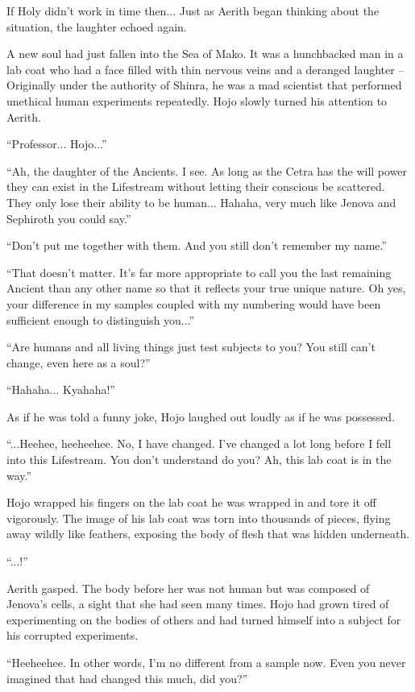\documentclass[oneside]{book}
\begin{document}
If Holy didn't work in time then... Just as Aerith began thinking about the situation, the laughter echoed again.

A new soul had just fallen into the Sea of Mako. It was a hunchbacked man in a lab coat who had a face filled with thin nervous veins and a deranged laughter – Originally under the authority of Shinra, he was a mad scientist that performed unethical human experiments repeatedly. Hojo slowly turned his attention to Aerith.

“Professor... Hojo...”

“Ah, the daughter of the Ancients. I see. As long as the Cetra has the will power they can exist in the Lifestream without letting their conscious be scattered. They only lose their ability to be human... Hahaha, very much like Jenova and Sephiroth you could say.”

“Don't put me together with them. And you still don't remember my name.”

“That doesn't matter. It's far more appropriate to call you the last remaining Ancient than any other name so that it reflects your true unique nature. Oh yes, your difference in my samples coupled with my numbering would have been sufficient enough to distinguish you...”

“Are humans and all living things just test subjects to you? You still can't change, even here as a soul?”

“Hahaha... Kyahaha!”

As if he was told a funny joke, Hojo laughed out loudly as if he was possessed.

“...Heehee, heeheehee. No, I have changed. I've changed a lot long before I fell into this Lifestream. You don't understand do you? Ah, this lab coat is in the way.”

Hojo wrapped his fingers on the lab coat he was wrapped in and tore it off vigorously. The image of his lab coat was torn into thousands of pieces, flying away wildly like feathers, exposing the body of flesh that was hidden underneath.

“...!”

Aerith gasped. The body before her was not human but was composed of Jenova's cells, a sight that she had seen many times. Hojo had grown tired of experimenting on the bodies of others and had turned himself into a subject for his corrupted experiments.

“Heeheehee. In other words, I'm no different from a sample now. Even you never imagined that had changed this much, did you?”
\end{document}
